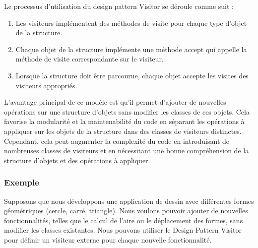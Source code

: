 \documentclass[french]{article}
\begin{document}
Le processus d'utilisation du design pattern Visitor se déroule comme suit :

\begin{enumerate}
    \item Les visiteurs implémentent des méthodes de visite pour chaque type d'objet de la structure.
    \item Chaque objet de la structure implémente une méthode accept qui appelle la méthode de visite correspondante sur le visiteur.
    \item Lorsque la structure doit être parcourue, chaque objet accepte les visites des visiteurs appropriés.
\end{enumerate}

L'avantage principal de ce modèle est qu'il permet d'ajouter de nouvelles opérations sur une structure d'objets sans modifier les classes de ces objets. Cela favorise la modularité et la maintenabilité du code en séparant les opérations à appliquer sur les objets de la structure dans des classes de visiteurs distinctes. Cependant, cela peut augmenter la complexité du code en introduisant de nombreuses classes de visiteurs et en nécessitant une bonne compréhension de la structure d'objets et des opérations à appliquer.


\subsubsection{Exemple}

Supposons que nous développons une application de dessin avec différentes formes géométriques (cercle, carré, triangle). Nous voulons pouvoir ajouter de nouvelles fonctionnalités, telles que le calcul de l'aire ou le déplacement des formes, sans modifier les classes existantes. Nous pouvons utiliser le Design Pattern Visitor pour définir un visiteur externe pour chaque nouvelle fonctionnalité.


\end{document}
